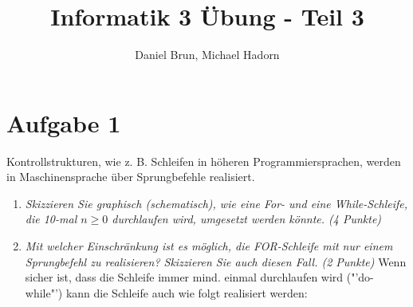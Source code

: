 \documentclass[10pt]{article}
\title{Informatik 3 Übung - Teil 3\vspace{-2ex}}
\author{Daniel Brun, Michael Hadorn\vspace{-2ex}}
\begin{document}
\maketitle

\section*{Aufgabe 1}
Kontrollstrukturen, wie z. B. Schleifen in höheren Programmiersprachen, werden in Maschinensprache über Sprungbefehle realisiert.
\begin{enumerate}[label=\alph*)]
	\item
		\textit{Skizzieren Sie graphisch (schematisch), wie eine For- und eine While-Schleife, die 10-mal \(n \ge 0\) durchlaufen wird, umgesetzt werden könnte. (4 Punkte)}
		
	
	
	
	\item
		\textit{Mit welcher Einschränkung ist es möglich, die FOR-Schleife mit nur einem Sprungbefehl zu realisieren? Skizzieren Sie auch diesen Fall. (2 Punkte)}
		Wenn sicher ist, dass die Schleife immer mind. einmal durchlaufen wird ("'do-while"') kann die Schleife auch wie folgt realisiert werden:
		
		
\end{enumerate}


\end{document}
